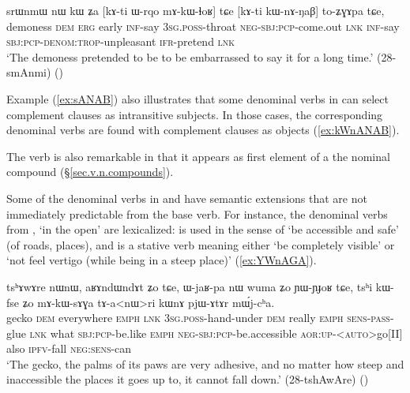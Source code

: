 \begin{exe}
\ex \label{ex:kWnANAB}
 \gll  srɯnmɯ nɯ kɯ ʑa [kɤ-ti ɯ-rqo mɤ-kɯ-ɬoʁ] tɕe [kɤ-ti kɯ-nɤ-ŋaβ] to-ʑɣɤpa tɕe, \\
demoness \textsc{dem} \textsc{erg} early \textsc{inf}-say \textsc{3sg}.\textsc{poss}-throat \textsc{neg}-\textsc{sbj}:\textsc{pcp}-come.out \textsc{lnk} \textsc{inf}-say \textsc{sbj}:\textsc{pcp}-\textsc{denom}:\textsc{trop}-unpleasant \textsc{ifr}-pretend \textsc{lnk} \\
\glt `The demoness pretended to be to be embarrassed to say it for a long time.' (28-smAnmi)
()
\end{exe}

Example (\ref{ex:sANAB})  also illustrates that some denominal verbs in  can select complement clauses as intransitive subjects. In those cases, the corresponding  denominal verbs are found with complement clauses as objects (\ref{ex:kWnANAB}).

The verb  is also remarkable in that it appears as first element of a the nominal compound   (§\ref{sec.v.n.compounds}). 
 
Some of the denominal verbs in  and  have semantic extensions that are not immediately predictable from the base verb. For instance, the denominal verbs from , `in the open'  are lexicalized:  is used in the sense of `be accessible and safe' (of roads, places), and  is a stative verb meaning either `be completely visible' or `not feel vertigo (while being in a steep place)' (\ref{ex:YWnAGA}).

\begin{exe}
\ex \label{ex:mAkWsAGa}
 \gll  tsʰɤwɤre nɯnɯ, aʁɤndɯndɤt ʑo tɕe, ɯ-jaʁ-pa nɯ wuma ʑo ɲɯ-ɲɟoʁ tɕe, tsʰi kɯ-fse ʑo mɤ-kɯ-sɤɣa tɤ-a<nɯ>ri kɯnɤ pjɯ-ɤtɤr mɯ́j-cʰa. \\
 gecko \textsc{dem} everywhere \textsc{emph} \textsc{lnk} \textsc{3sg}.\textsc{poss}-hand-under \textsc{dem} really \textsc{emph} \textsc{sens}-\textsc{pass}-glue \textsc{lnk} what \textsc{sbj}:\textsc{pcp}-be.like \textsc{emph} \textsc{neg}-\textsc{sbj}:\textsc{pcp}-be.accessible \textsc{aor}:\textsc{up}-<\textsc{auto}>go[II] also \textsc{ipfv}-fall \textsc{neg}:\textsc{sens}-can \\
\glt `The gecko, the palms of its paws are very adhesive, and no matter how steep and inaccessible the places it goes up to, it cannot fall down.' (28-tshAwAre)
()
 \end{exe}
 

